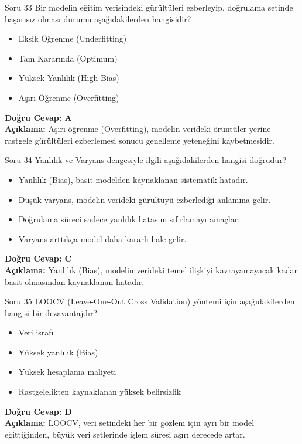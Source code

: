 \documentclass[12pt,a4paper]{article}
\begin{document}
\begin{testcard}{Soru 33}
    Bir modelin eğitim verisindeki gürültüleri ezberleyip, doğrulama setinde başarısız olması durumu aşağıdakilerden hangisidir?
    \begin{itemize}
        \item[A)] Eksik Öğrenme (Underfitting)
        \item[B)] Tam Kararında (Optimum)
        \item[C)] Yüksek Yanlılık (High Bias)
        \item[D)] Aşırı Öğrenme (Overfitting)
    \end{itemize}
    \tcblower
    \textbf{Doğru Cevap: A} \\
    \textbf{Açıklama:} Aşırı öğrenme (Overfitting), modelin verideki örüntüler yerine rastgele gürültüleri ezberlemesi sonucu genelleme yeteneğini kaybetmesidir.
\end{testcard}

\begin{testcard}{Soru 34}
    Yanlılık ve Varyans dengesiyle ilgili aşağıdakilerden hangisi doğrudur?
    \begin{itemize}
        \item[A)] Yanlılık (Bias), basit modelden kaynaklanan sistematik hatadır.
        \item[B)] Düşük varyans, modelin verideki gürültüyü ezberlediği anlamına gelir.
        \item[C)] Doğrulama süreci sadece yanlılık hatasını sıfırlamayı amaçlar.
        \item[D)] Varyans arttıkça model daha kararlı hale gelir.
    \end{itemize}
    \tcblower
    \textbf{Doğru Cevap: C} \\
    \textbf{Açıklama:} Yanlılık (Bias), modelin verideki temel ilişkiyi kavrayamayacak kadar basit olmasından kaynaklanan hatadır.
\end{testcard}

\begin{testcard}{Soru 35}
    LOOCV (Leave-One-Out Cross Validation) yöntemi için aşağıdakilerden hangisi bir dezavantajdır?
    \begin{itemize}
        \item[A)] Veri israfı
        \item[B)] Yüksek yanlılık (Bias)
        \item[C)] Yüksek hesaplama maliyeti
        \item[D)] Rastgelelikten kaynaklanan yüksek belirsizlik
    \end{itemize}
    \tcblower
    \textbf{Doğru Cevap: D} \\
    \textbf{Açıklama:} LOOCV, veri setindeki her bir gözlem için ayrı bir model eğittiğinden, büyük veri setlerinde işlem süresi aşırı derecede artar.
\end{testcard}
\end{document}
